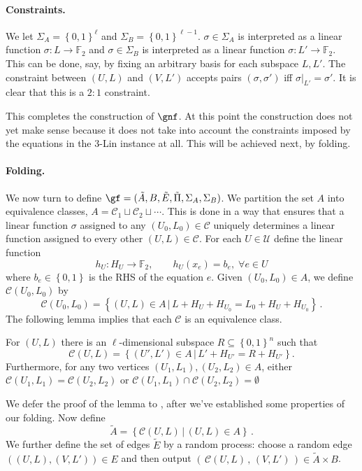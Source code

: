 \documentclass{toc}
\newcommand\set[1]{{\left\{ #1 \right\}}}
\newcommand\power[1]{\set{0,1}^{#1}}
\newcommand\Set[2]{ \left\{ #1 \,  \vert  \, #2\right\} }
\renewcommand\subset{\subseteq}
\def\F{\mathbb{F}}
\def\U{\mathcal{U}}
\def\C{\mathcal{C}}
\begin{document}
\paragraph{Constraints.}
We let $\Sigma_A = \power{\ell}$ and $\Sigma_B = \power{\ell-1}$.
$\sigma\in \Sigma_A$ is interpreted as a linear function $\sigma:L\to\F_2$ and $\sigma\in \Sigma_B$ is interpreted as a linear function $\sigma:L'\to\F_2$.  This can be done, say, by fixing an arbitrary basis for each subspace $L,L'$.
The constraint between $(U,L)$ and $(V,L')$ accepts pairs $(\sigma,\sigma')$ iff  $\sigma|_{L'} = \sigma'$. It is clear that this is a $2:1$ constraint.

This completes the construction of $\gnf$. At this point the construction does not yet make sense because it does not take into account the constraints imposed by the equations in the 3-Lin instance at all. This will be achieved next, by folding.
%
\paragraph{Folding.}
We now turn to define $\gf = (\tilde A,B,\tilde E,\tilde \Pi,\Sigma_A,\Sigma_B)$.
We partition the set $A$ into equivalence classes, $A = \C_1 \sqcup \C_2 \sqcup \cdots$. This is done in a way that ensures that a linear function $\sigma$ assigned to any $(U_0,L_0)\in \C$ uniquely determines a linear function assigned to every other $(U,L)\in \C$. For each $U\in \U$ define the linear function
\begin{equation}\label{eq:hu} h_U:H_U\to\F_2, \qquad h_U(x_e)=b_e, \; \forall e\in U
\end{equation} where $b_e\in\set{0,1}$ is the RHS of the equation $e$.
Given $(U_0,L_0)\in A$, we define $\C(U_0,L_0)$ by
\[
\C(U_0,L_0) = \Set{(U,L)\in A}{ L + H_U + H_{U_0} = L_0 + H_U + H_{U_0}}\,.
\]
The following lemma implies that each $\C$ is an equivalence class.
\begin{lemma}\label{lemma:folding-prop}
For $(U,L)$ there is an $\ell$-dimensional subspace $R \subset \power n$ such that
\[ \C(U,L) = \Set{ (U',L')\in A }{ L'+H_{U'}= R+H_{U'}}.
\]
Furthermore, for any two vertices $(U_1,L_1),(U_2,L_2)\in A$, either $\C(U_1,L_1) = \C(U_2,L_2)$ or $\C(U_1,L_1) \cap \C(U_2,L_2)=\emptyset$
%
 \end{lemma}
%
We defer the proof of the lemma to
, after we've established some
properties of our folding. Now define
\[ \tilde A = \Set{\C(U,L) }{ (U,L)\in A}\,. \]
%
We further define the set of edges $\tilde E$ by a random process: choose a random edge $((U,L),(V,L'))\in E$ and then output $(\,\C(U,L)\,,\,(V,L')\,)\in \tilde A\times B$.
\end{document}

